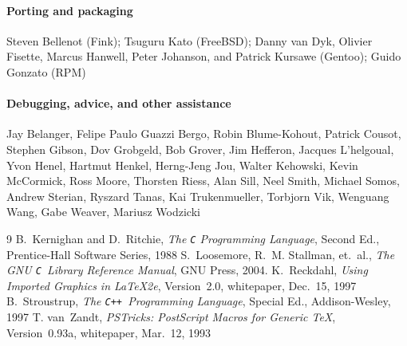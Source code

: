 \documentclass[12pt]{report}
\newcommand{\code}[1]{\texttt{#1}}
\newcommand{\CXX}{\code{C++}}
\begin{document}
\paragraph{Porting and packaging} Steven Bellenot (Fink); Tsuguru Kato
(FreeBSD); Danny van Dyk, Olivier Fisette, Marcus Hanwell, Peter
Johanson, and Patrick Kursawe (Gentoo); Guido Gonzato (RPM)

\paragraph{Debugging, advice, and other assistance} Jay Belanger,
Felipe Paulo Guazzi Bergo, Robin Blume-Kohout, Patrick Cousot, Stephen
Gibson, Dov Grobgeld, Bob Grover, Jim Hefferon, Jacques L'helgoual,
Yvon Henel, Hartmut Henkel, Herng-Jeng Jou, Walter Kehowski, Kevin
McCormick, Ross Moore, Thorsten Riess, Alan Sill, Neel Smith, Michael
Somos, Andrew Sterian, Ryszard Tanas, Kai Trukenmueller, Torbjorn Vik,
Wenguang Wang, Gabe Weaver, Mariusz Wodzicki

\begin{thebibliography}{9}
%
 B.~Kernighan and D.~Ritchie, \emph{The \code{C}
    Programming Language}, Second Ed., Prentice-Hall Software Series,
    1988
%
 S.~Loosemore, R.~M. Stallman, et.\ al., \emph{The GNU
    \code{C}~Library Reference Manual}, GNU Press, 2004.
%
 K.~Reckdahl, \emph{Using Imported Graphics in \LaTeX2e},
  Version~2.0, whitepaper, Dec.~15, 1997
%
 B.~Stroustrup, \emph{The \CXX\ Programming Language},
  Special Ed., Addison-Wesley, 1997
%
 T. van~Zandt, \emph{PSTricks: PostScript Macros for
    Generic \TeX}, Version~0.93a, whitepaper, Mar.~12, 1993
%
\end{thebibliography}

\clearpage

\printindex
\end{document}
